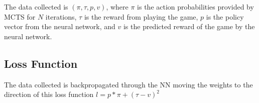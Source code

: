 The data collected is $(\pi, \tau, p, v)$, where $\pi$ is the action probabilities provided by 
MCTS for $N$ iterations, $\tau$ is the reward from playing the game, $p$ is the policy vector
from the neural network, and $v$ is the predicted reward of the game by the neural network.

\subsection{Loss Function}

The data collected is backpropagated through the NN moving the weights to the direction of this 
loss function $l = p * \pi + (\tau - v)^2$
